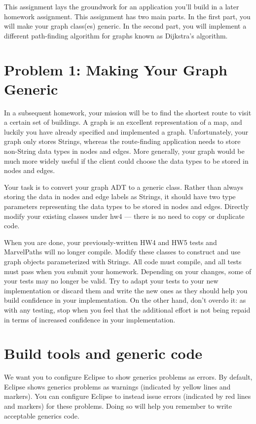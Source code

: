 \documentclass[11pt]{article}
\begin{document}
\noindent This assignment lays the groundwork for an application you'll build in a later homework assignment. This assignment has two main parts. In the first part, you will make your graph class(es) generic. In the second part, you will implement a different path-finding algorithm for graphs known as Dijkstra's algorithm.

\newpage


\section*{Problem 1: Making Your Graph Generic}
\label{sec:Problem 1}

\noindent In a subsequent homework, your mission will be to find the shortest route to visit a certain set of buildings. A graph is an excellent representation of a map, and luckily you have already specified and implemented a graph. Unfortunately, your graph only stores Strings, whereas the route-finding application needs to store non-String data types in nodes and edges. More generally, your graph would be much more widely useful if the client could choose the data types to be stored in nodes and edges. 

\noindent Your task is to convert your graph ADT to a generic class. Rather than always storing the data in nodes and edge labels as Strings, it should have two type parameters representing the data types to be stored in nodes and edges. Directly modify your existing classes under hw4 — there is no need to copy or duplicate code.

\noindent When you are done, your previously-written HW4 and HW5 tests and MarvelPaths will no longer compile. Modify these classes to construct and use graph objects parameterized with Strings. All code must compile, and all tests must pass when you submit your homework. Depending on your changes, some of your tests may no longer be valid. Try to adapt your tests to your new implementation or discard them and write the new ones as they should help you build confidence in your implementation. On the other hand, don't overdo it: as with any testing, stop when you feel that the additional effort is not being repaid in terms of increased confidence in your implementation.

\section*{Build tools and generic code}
\label{sec:Generics}
\noindent We want you to configure Eclipse to show generics problems as errors. By default, Eclipse shows generics problems as warnings (indicated by yellow lines and markers). You can configure Eclipse to instead issue errors (indicated by red lines and markers) for these problems. Doing so will help you remember to write acceptable generics code.
\end{document}
